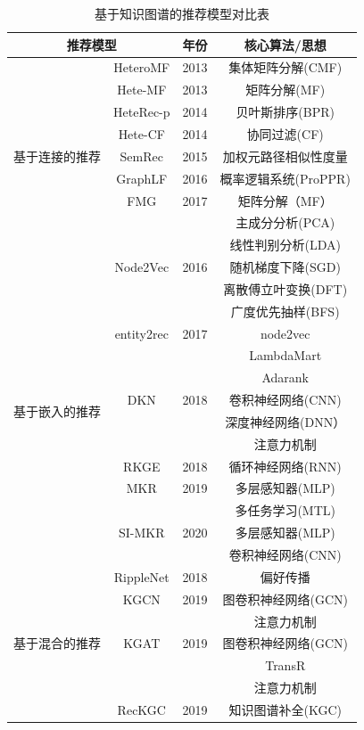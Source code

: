 \documentclass{article}
\begin{document}
{	\begin{table}[H]
		\centering
		\caption{基于知识图谱的推荐模型对比表}
		\begin{tabular}{cccc}
			\hline
			\multicolumn{2}{c}{推荐模型} & 年份 & 核心算法/思想 \\ \hline
			\multirow{9}{*}{基于连接的推荐} & HeteroMF & 2013 & 集体矩阵分解(CMF) \\
			& Hete-MF & 2013 & 矩阵分解(MF) \\
			& HeteRec-p & 2014 & 贝叶斯排序(BPR) \\
			& Hete-CF & 2014 & 协同过滤(CF) \\
			& SemRec & 2015 & 加权元路径相似性度量 \\
			& GraphLF & 2016 & 概率逻辑系统(ProPPR) \\
			& FMG & 2017 & 矩阵分解（MF） \\
			&  &  & 主成分分析(PCA) \\
			&  &  & 线性判别分析(LDA) \\ \hline
			\multirow{14}{*}{基于嵌入的推荐} & Node2Vec & 2016 & 随机梯度下降(SGD) \\
			&  &  & 离散傅立叶变换(DFT) \\
			&  &  & 广度优先抽样(BFS) \\
			& entity2rec & 2017 & node2vec \\
			&  &  & LambdaMart \\
			&  &  & Adarank \\
			& DKN & 2018 & 卷积神经网络(CNN) \\
			&  &  & 深度神经网络(DNN） \\
			&  &  & 注意力机制 \\
			& RKGE & 2018 & 循环神经网络(RNN) \\
			& MKR & 2019 & 多层感知器(MLP) \\
			&  &  & 多任务学习(MTL) \\
			& SI-MKR & 2020 & 多层感知器(MLP) \\
			&  &  & 卷积神经网络(CNN) \\ \hline
			\multirow{16}{*}{基于混合的推荐} & RippleNet & 2018 & 偏好传播 \\
			& KGCN & 2019 & 图卷积神经网络(GCN) \\
			&  &  & 注意力机制 \\
			& KGAT & 2019 & 图卷积神经网络(GCN) \\
			&  &  & TransR \\
			&  &  & 注意力机制 \\
			& RecKGC & 2019 & 知识图谱补全(KGC) \\

\end{tabular}
\end{table}}
\end{document}
